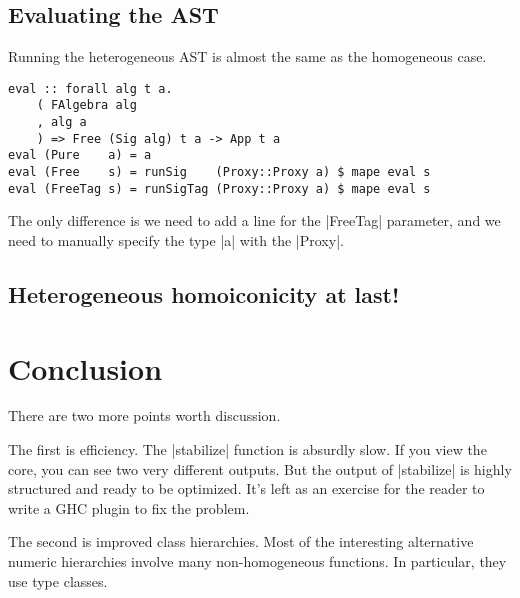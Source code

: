 \documentclass[preprint]{sigplanconf}
\theoremstyle{definition}
\begin{document}
\subsection{Evaluating the AST}

Running the heterogeneous AST is almost the same as the homogeneous case.
\begin{lstlisting}
eval :: forall alg t a.
    ( FAlgebra alg
    , alg a
    ) => Free (Sig alg) t a -> App t a
eval (Pure    a) = a
eval (Free    s) = runSig    (Proxy::Proxy a) $ mape eval s
eval (FreeTag s) = runSigTag (Proxy::Proxy a) $ mape eval s
\end{lstlisting}
The only difference is we need to add a line for the |FreeTag| parameter,
and we need to manually specify the type |a| with the |Proxy|.

\subsection{Heterogeneous homoiconicity at last!}

\section{Conclusion}

There are two more points worth discussion.

The first is efficiency.
The |stabilize| function is absurdly slow.
If you view the core, you can see two very different outputs.
But the output of |stabilize| is highly structured and ready to be optimized.
It's left as an exercise for the reader to write a GHC plugin to fix the problem.

The second is improved class hierarchies.
Most of the interesting alternative numeric hierarchies involve many non-homogeneous functions.
In particular, they use type classes.



%
%
%
%




\end{document}
